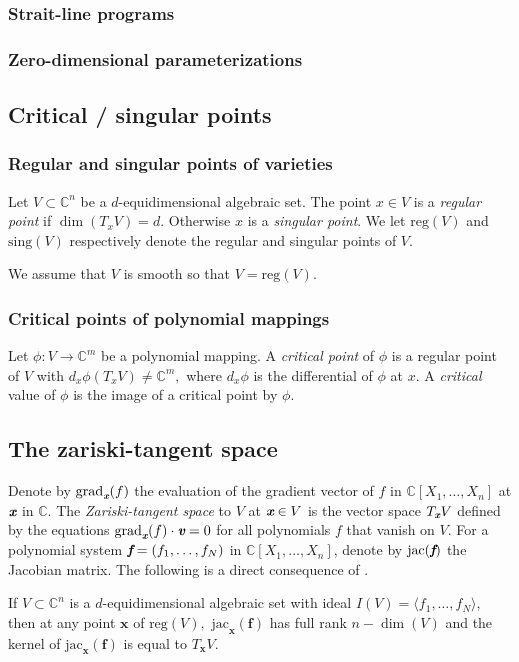 \documentclass[sigconf]{acmart}
\def\xb{\textit{\textbf{x}}}
\def\C{\mathbb{C}}
\def\sing{ \textrm{sing}}
\def\jac{ \textrm{jac}}
\def\grad{\textrm{grad}}
\def\reg{\textrm{reg}}
\def\bbm{\begin{bmatrix}}
\def\ebm{\end{bmatrix}}
\begin{document}
\subsubsection{Strait-line programs}
\subsubsection{Zero-dimensional parameterizations}
%
%
%
%
\subsection{Critical / singular points}
\subsubsection{Regular and singular points of varieties}
Let $V \subset \C^n$ be a $d$-equidimensional algebraic set. 
The point $x \in V$ is a \textit{regular point} if $\dim (T_xV) = d.$ Otherwise $x$ is a \textit{singular point}. We let $\reg(V)$ and $\sing(V)$ respectively denote the regular and singular points of $V$. 
%
\par 
We assume that $V$ is smooth so that $V=\reg(V).$
%
%
%
%
%
%
\subsubsection{Critical points of polynomial mappings}
Let $\phi : V \rightarrow \C^m$ be a polynomial mapping. A \textit{critical point} of $\phi$ is a regular point of $V$ with $d_x \phi(T_xV) \not = \C^m,$ where $d_x \phi$ is the differential of $\phi$ at $x.$ A \textit{critical} value of $\phi$ is the image of a critical point by $\phi$.
%
%
%
\subsection{The zariski-tangent space}
Denote by $\grad_{\xb}(f)$ the evaluation of the gradient vector of $f$ in $\C[X_1,\hdots,X_n]$ at $\textit{\textbf{x}}$ in $\C$.
The \textit{Zariski-tangent space} to $V$ at $\textit{\textbf{x}} \in V$ is the vector space $T_{\xb}V$ defined by the equations $\grad_{\xb}(f) \cdot \textit{\textbf{v}}=0$ for all polynomials $f$ that vanish on $V$. For a polynomial system $\textit{\textbf{f}}=(f_1,\hdots,f_N)$ in $\C[X_1,\hdots,X_n]$, denote by $\jac(\textit{\textbf{f}})$ the Jacobian matrix.
The following is a direct consequence of \cite[Corollary 16.20]{ECA}.
\begin{proposition}
If $V \subset \C^n$ is a $d$-equidimensional algebraic set with ideal $I(V)=\langle f_1,\hdots,f_N \rangle$, then at any point $\textbf{x}$ of $\reg(V),$ $\jac_\textbf{x}(\textbf{f})$ has full rank $n - \dim(V)$ and the kernel of $\jac_\textbf{x}(\textbf{f})$ is equal to $T_\textbf{x}V.$ 
\end{proposition}
%
%
%
\end{document}
